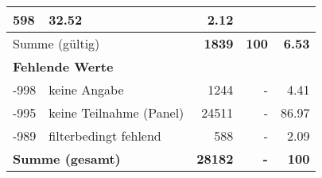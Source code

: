 \begin{longtable}{lXrrr}
       \num{598} &
       \num[round-mode=places,round-precision=2]{32.52} &
         \num[round-mode=places,round-precision=2]{2.12} \\
     \midrule
     \multicolumn{2}{l}{Summe (gültig)} &
       \textbf{\num{1839}} &
     \textbf{\num{100}} &
       \textbf{\num[round-mode=places,round-precision=2]{6.53}} \\
     \multicolumn{5}{l}{\textbf{Fehlende Werte}}\\
       -998 &
       keine Angabe &
         \num{1244} &
        - &
         \num[round-mode=places,round-precision=2]{4.41} \\
       -995 &
       keine Teilnahme (Panel) &
         \num{24511} &
        - &
         \num[round-mode=places,round-precision=2]{86.97} \\
       -989 &
       filterbedingt fehlend &
         \num{588} &
        - &
         \num[round-mode=places,round-precision=2]{2.09} \\
     \midrule
     \multicolumn{2}{l}{\textbf{Summe (gesamt)}} &
          \textbf{\num{28182}} &
        \textbf{-} &
        \textbf{\num{100}} \\
     \bottomrule
     \end{longtable}
     
